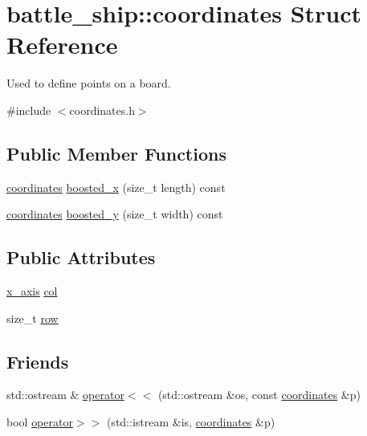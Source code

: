 \hypertarget{structbattle__ship_1_1coordinates}{}\section{battle\+\_\+ship\+:\+:coordinates Struct Reference}
\label{structbattle__ship_1_1coordinates}


Used to define points on a board.  




{\ttfamily \#include $<$coordinates.\+h$>$}

\subsection*{Public Member Functions}
\begin{DoxyCompactItemize}
\item 
\hyperlink{structbattle__ship_1_1coordinates}{coordinates} \hyperlink{structbattle__ship_1_1coordinates_ab72dd07aa255aef070909f3070786680}{boosted\+\_\+x} (size\+\_\+t length) const
\item 
\hyperlink{structbattle__ship_1_1coordinates}{coordinates} \hyperlink{structbattle__ship_1_1coordinates_ae09ab4c8792c9f91159dcf11071d6717}{boosted\+\_\+y} (size\+\_\+t width) const
\end{DoxyCompactItemize}
\subsection*{Public Attributes}
\begin{DoxyCompactItemize}
\item 
\hyperlink{namespacebattle__ship_ab3bfa90e413692dac2d4463364f80561}{x\+\_\+axis} \hyperlink{structbattle__ship_1_1coordinates_acda28ed24b163de319f6431762db3a72}{col}
\item 
size\+\_\+t \hyperlink{structbattle__ship_1_1coordinates_a68c97ae4b9f30e2d5f20f3727546a29b}{row}
\end{DoxyCompactItemize}
\subsection*{Friends}
\begin{DoxyCompactItemize}
\item 
std\+::ostream \& \hyperlink{structbattle__ship_1_1coordinates_a3addd697b39df26c1807d744c30e65b5}{operator$<$$<$} (std\+::ostream \&os, const \hyperlink{structbattle__ship_1_1coordinates}{coordinates} \&p)
\item 
bool \hyperlink{structbattle__ship_1_1coordinates_afd9a944ba3ab08355a0ae36d35e57d85}{operator$>$$>$} (std\+::istream \&is, \hyperlink{structbattle__ship_1_1coordinates}{coordinates} \&p)
\end{DoxyCompactItemize}


